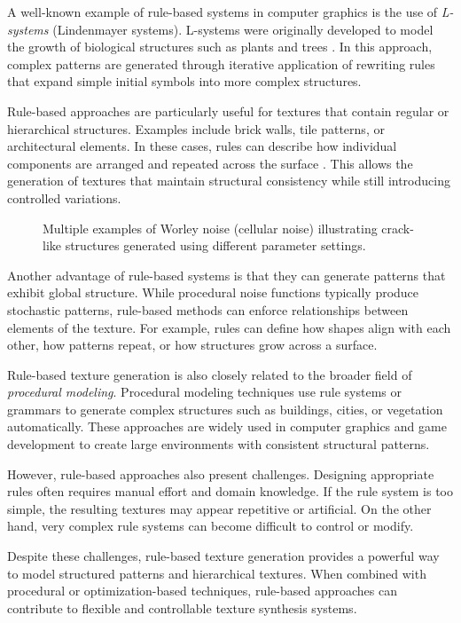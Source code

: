 A well-known example of rule-based systems in computer graphics is the use of \textit{L-systems} (Lindenmayer systems). L-systems were originally developed to model the growth of biological structures such as plants and trees \cite{prusinkiewicz1990algorithmic}. In this approach, complex patterns are generated through iterative application of rewriting rules that expand simple initial symbols into more complex structures.

Rule-based approaches are particularly useful for textures that contain regular or hierarchical structures. Examples include brick walls, tile patterns, or architectural elements. In these cases, rules can describe how individual components are arranged and repeated across the surface \cite{ebert2003texturing}. This allows the generation of textures that maintain structural consistency while still introducing controlled variations.

\begin{figure}[H]
    \centering
    {Multiple examples of Worley noise (cellular noise) illustrating crack-like structures generated using different parameter settings.}
    \label{fig:worley-multiple-examples}
\end{figure}

Another advantage of rule-based systems is that they can generate patterns that exhibit global structure. While procedural noise functions typically produce stochastic patterns, rule-based methods can enforce relationships between elements of the texture. For example, rules can define how shapes align with each other, how patterns repeat, or how structures grow across a surface.

Rule-based texture generation is also closely related to the broader field of \textit{procedural modeling}. Procedural modeling techniques use rule systems or grammars to generate complex structures such as buildings, cities, or vegetation automatically. These approaches are widely used in computer graphics and game development to create large environments with consistent structural patterns.

However, rule-based approaches also present challenges. Designing appropriate rules often requires manual effort and domain knowledge. If the rule system is too simple, the resulting textures may appear repetitive or artificial. On the other hand, very complex rule systems can become difficult to control or modify.

Despite these challenges, rule-based texture generation provides a powerful way to model structured patterns and hierarchical textures. When combined with procedural or optimization-based techniques, rule-based approaches can contribute to flexible and controllable texture synthesis systems.

